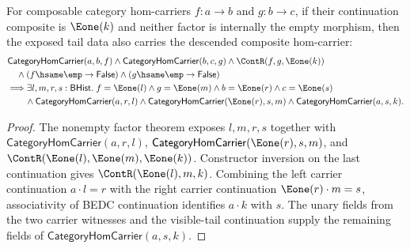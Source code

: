 \begin{theorem}
\label{thm:category-hom-carrier-comp-nonempty-e1-morphism-result-descent}
For composable category hom-carriers $f:a\to b$ and $g:b\to c$, if their
continuation composite is $\Eone(k)$ and neither factor is internally the
empty morphism, then the exposed tail data also carries the descended
composite hom-carrier:
$$
\begin{aligned}
&\mathsf{CategoryHomCarrier}(a,b,f)\land
\mathsf{CategoryHomCarrier}(b,c,g)\land
\ContR(f,g,\Eone(k))\\
&\quad\land (f\hsame\emp\to\mathsf{False})\land
(g\hsame\emp\to\mathsf{False})\\
&\Longrightarrow
\exists l,m,r,s:\mathsf{BHist}.\;
f=\Eone(l)\land g=\Eone(m)\land b=\Eone(r)\land c=\Eone(s)\\
&\qquad\land\mathsf{CategoryHomCarrier}(a,r,l)\land
\mathsf{CategoryHomCarrier}(\Eone(r),s,m)\land
\mathsf{CategoryHomCarrier}(a,s,k).
\end{aligned}
$$
\end{theorem}
\begin{proof}
The nonempty factor theorem exposes $l,m,r,s$ together with
$\mathsf{CategoryHomCarrier}(a,r,l)$,
$\mathsf{CategoryHomCarrier}(\Eone(r),s,m)$, and
$\ContR(\Eone(l),\Eone(m),\Eone(k))$. Constructor inversion on the last
continuation gives $\ContR(\Eone(l),m,k)$. Combining the left carrier
continuation $a\cdot l=r$ with the right carrier continuation
$\Eone(r)\cdot m=s$, associativity of BEDC continuation identifies
$a\cdot k$ with $s$. The unary fields from the two carrier witnesses and the
visible-tail continuation supply the remaining fields of
$\mathsf{CategoryHomCarrier}(a,s,k)$.
\end{proof}

